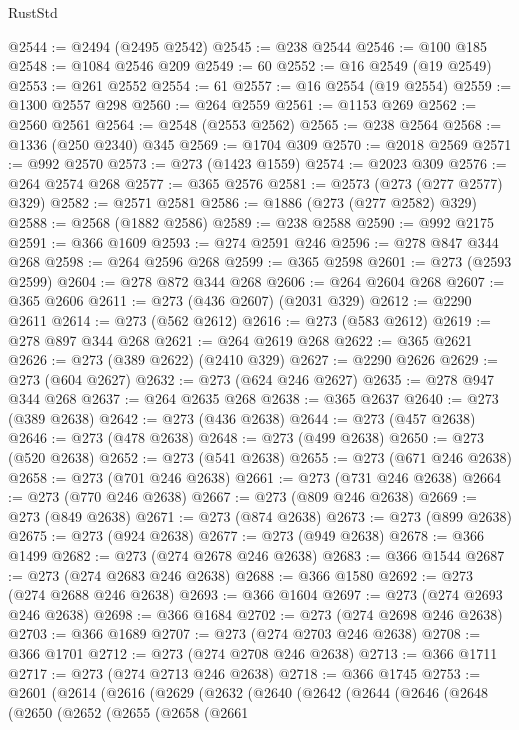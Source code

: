 \begin{lexlean}{RustStd}
\begin{coremodule}
{\begin{coremodule}
{{{{{{{{{{{{{{{{{{{{{{{{{{{{{{{{{{{{{{{{{{{{{{{{{{{{{{{{{{{{{{{{{{{{{{{{{{{{{{{{{{{{{@2544 := @2494 (@2495 @2542)
@2545 := @238 @2544
@2546 := @100 @185
@2548 := @1084 @2546 @209
@2549 := 60
@2552 := @16 @2549 (@19 @2549)
@2553 := @261 @2552
@2554 := 61
@2557 := @16 @2554 (@19 @2554)
@2559 := @1300 @2557 @298
@2560 := @264 @2559
@2561 := @1153 @269
@2562 := @2560 @2561
@2564 := @2548 (@2553 @2562)
@2565 := @238 @2564
@2568 := @1336 (@250 @2340) @345
@2569 := @1704 @309
@2570 := @2018 @2569
@2571 := @992 @2570
@2573 := @273 (@1423 @1559)
@2574 := @2023 @309
@2576 := @264 @2574 @268
@2577 := @365 @2576
@2581 := @2573 (@273 (@277 @2577) @329)
@2582 := @2571 @2581
@2586 := @1886 (@273 (@277 @2582) @329)
@2588 := @2568 (@1882 @2586)
@2589 := @238 @2588
@2590 := @992 @2175
@2591 := @366 @1609
@2593 := @274 @2591 @246
@2596 := @278 @847 @344 @268
@2598 := @264 @2596 @268
@2599 := @365 @2598
@2601 := @273 (@2593 @2599)
@2604 := @278 @872 @344 @268
@2606 := @264 @2604 @268
@2607 := @365 @2606
@2611 := @273 (@436 @2607) (@2031 @329)
@2612 := @2290 @2611
@2614 := @273 (@562 @2612)
@2616 := @273 (@583 @2612)
@2619 := @278 @897 @344 @268
@2621 := @264 @2619 @268
@2622 := @365 @2621
@2626 := @273 (@389 @2622) (@2410 @329)
@2627 := @2290 @2626
@2629 := @273 (@604 @2627)
@2632 := @273 (@624 @246 @2627)
@2635 := @278 @947 @344 @268
@2637 := @264 @2635 @268
@2638 := @365 @2637
@2640 := @273 (@389 @2638)
@2642 := @273 (@436 @2638)
@2644 := @273 (@457 @2638)
@2646 := @273 (@478 @2638)
@2648 := @273 (@499 @2638)
@2650 := @273 (@520 @2638)
@2652 := @273 (@541 @2638)
@2655 := @273 (@671 @246 @2638)
@2658 := @273 (@701 @246 @2638)
@2661 := @273 (@731 @246 @2638)
@2664 := @273 (@770 @246 @2638)
@2667 := @273 (@809 @246 @2638)
@2669 := @273 (@849 @2638)
@2671 := @273 (@874 @2638)
@2673 := @273 (@899 @2638)
@2675 := @273 (@924 @2638)
@2677 := @273 (@949 @2638)
@2678 := @366 @1499
@2682 := @273 (@274 @2678 @246 @2638)
@2683 := @366 @1544
@2687 := @273 (@274 @2683 @246 @2638)
@2688 := @366 @1580
@2692 := @273 (@274 @2688 @246 @2638)
@2693 := @366 @1604
@2697 := @273 (@274 @2693 @246 @2638)
@2698 := @366 @1684
@2702 := @273 (@274 @2698 @246 @2638)
@2703 := @366 @1689
@2707 := @273 (@274 @2703 @246 @2638)
@2708 := @366 @1701
@2712 := @273 (@274 @2708 @246 @2638)
@2713 := @366 @1711
@2717 := @273 (@274 @2713 @246 @2638)
@2718 := @366 @1745
@2753 := @2601
    (@2614
      (@2616
        (@2629
          (@2632
            (@2640
              (@2642
                (@2644
                  (@2646
                    (@2648
                      (@2650
                        (@2652
                          (@2655
                            (@2658
                              (@2661
}}}}}}}}}}}}}}}}}}}}}}}}}}}}}}}}}}}}}}}}}}}}}}}}}}}}}}}}}}}}}}}}}}}}}}}}}}}}}}}}}}}}}
\end{coremodule}}
\end{coremodule}
\end{lexlean}
